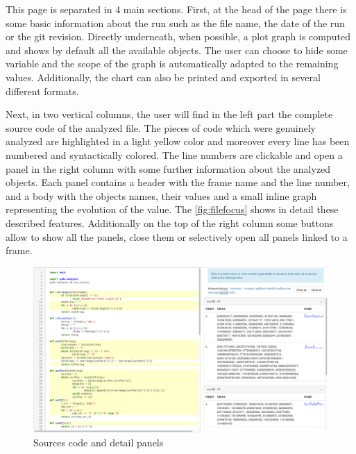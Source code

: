 This page is separated in 4 main sections. First, at the head of the page there is some basic information about the run such as the file name, the date of the run or the git revision. Directly underneath, when possible, a plot graph is computed and shows by default all the available objects. The user can choose to hide some variable and the scope of the graph is automatically adapted to the remaining values. Additionally, the chart can also be printed and exported in several different formats.

Next, in two vertical columns, the user will find in the left part the complete source code of the analyzed file. The pieces of code which were genuinely analyzed are highlighted in a light yellow color and moreover every line has been numbered and syntactically colored. The line numbers are clickable and open a panel in the right column with some further information about the analyzed objects. Each panel contains a header with the frame name and the line number, and a body with the objects names, their values and a small inline graph representing the evolution of the value. The \autoref{fig:filefocus} shows in detail these described features. Additionally on the top of the right column some buttons allow to show all the panels, close them or selectively open all panels linked to a frame.

\begin{figure}[h!]
  \centering
    \includegraphics[width=\textwidth]{figures/yoda-file-focus.png}
    \caption{Sources code and detail panels}
    \label{fig:filefocus}
\end{figure}

